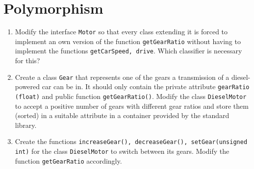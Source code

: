 \documentclass[12pt, a4paper]{article}
\begin{document}
\section*{Polymorphism}
\begin{enumerate}
    \item Modify the interface \lstinline{Motor} so that every class extending it is forced to implement an own version of the function \lstinline{getGearRatio} without having to implement the functions \lstinline{getCarSpeed, drive}. Which classifier is necessary for this?
    \item Create a class \lstinline{Gear} that represents one of the gears a transmission of a diesel-powered car can be in. It should only contain the private attribute \lstinline{gearRatio (float)} and public function \lstinline{getGearRatio()}. Modify the class \lstinline{DieselMotor} to accept a positive number of gears with different gear ratios and store them (sorted) in a suitable attribute in a container provided by the standard library.
    \item Create the functions \lstinline{increaseGear(), decreaseGear(), setGear(unsigned int)} for the class \lstinline{DieselMotor} to switch between its gears. Modify the function \lstinline{getGearRatio} accordingly.
\end{enumerate}
\end{document}
